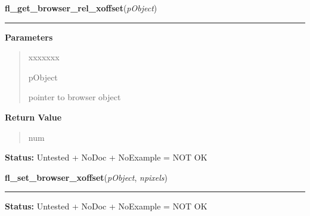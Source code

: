 \hspace{.8\funcindent}\begin{boxedminipage}{\funcwidth}

    \raggedright \textbf{fl\_get\_browser\_rel\_xoffset}(\textit{pObject})

    \vspace{-1.5ex}

    \rule{\textwidth}{0.5\fboxrule}
\setlength{\parskip}{2ex}
\setlength{\parskip}{1ex}
      \textbf{Parameters}
      \vspace{-1ex}

      \begin{quote}
        \begin{Ventry}{xxxxxxx}

          \item[pObject]

          pointer to browser object

        \end{Ventry}

      \end{quote}

      \textbf{Return Value}
    \vspace{-1ex}

      \begin{quote}
      num

      \end{quote}

\textbf{Status:} Untested + NoDoc + NoExample = NOT OK



    \end{boxedminipage}

    \label{xformslib:library:fl_set_browser_xoffset}

    \vspace{0.5ex}

\hspace{.8\funcindent}\begin{boxedminipage}{\funcwidth}

    \raggedright \textbf{fl\_set\_browser\_xoffset}(\textit{pObject}, \textit{npixels})

    \vspace{-1.5ex}

    \rule{\textwidth}{0.5\fboxrule}
\setlength{\parskip}{2ex}
\setlength{\parskip}{1ex}
\textbf{Status:} Untested + NoDoc + NoExample = NOT OK



    \end{boxedminipage}

